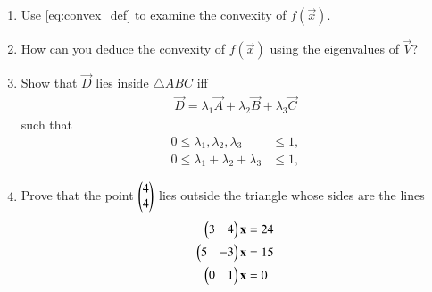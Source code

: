 \begin{enumerate}[label=\arabic*.,ref=\thesection.\theenumi]
\item Use \eqref{eq:convex_def} to examine the convexity of $f(\vec{x})$.
\item How can you deduce the convexity of $f(\vec{x})$ using the eigenvalues of $\vec{V}$?
\item Show that $\vec{D}$ lies inside $\triangle ABC$ iff
\begin{align}
\vec{D} = \lambda_1\vec{A} + \lambda_2\vec{B} + \lambda_3\vec{C}
\end{align}
such that
\begin{align}
0 \le \lambda_1, \lambda_2, \lambda_3 &\le 1,
\\
0 \le \lambda_1+\lambda_2+\lambda_3 &\le 1,
\end{align}
\item Prove that the point $\begin{pmatrix}4\\4\end{pmatrix}$ lies outside the triangle whose sides are the lines
\begin{align}
\begin{pmatrix}3&4\end{pmatrix} \mathbf{x}&= 24
\\
\begin{pmatrix} 5 & - 3\end{pmatrix} \mathbf{x}&= 15
\\
\begin{pmatrix}0 &1\end{pmatrix} \mathbf{x}&= 0
\end{align}


\end{enumerate}
%

